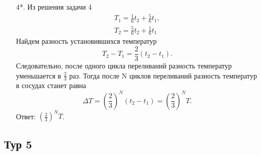 \documentclass[12pt]{article} %
\begin{document}
\begin{enumerate}
    \item[4*.] 
        Из решения задачи 4
        \begin{align}
            T_1 = \frac{1}{6}t_2 + \frac{5}{6}t_1, \\
            T_2 = \frac{5}{6}t_2 + \frac{1}{6}t_1
        \end{align}
        Найдем разность установившихся температур
        \[
            T_2 - T_1 = \frac{2}{3}(t_2-t_1).
        \]
        Следовательно, после одного цикла переливаний разность температур уменьшается в $\frac{2}{3}$ раз. Тогда после N циклов переливаний разность температур в сосудах станет равна
        \[
            \Delta T=\left(\frac{2}{3}\right)^N(t_2-t_1) = \left(\frac{2}{3}\right)^N T.
        \]
        Ответ: $\left(\frac{2}{3}\right)^N T$.
        
    \end{enumerate}
    
    
\subsection*{Тур 5}
\end{document}
